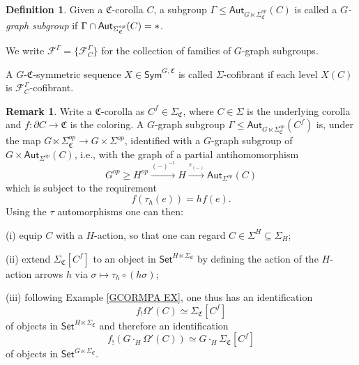 \documentclass[a4paper,10pt
,draft
]{article}%
\numberwithin{equation}{section}
\numberwithin{figure}{section}
\theoremstyle{definition} %
\newtheorem{definition}[equation]{Definition}%
\newtheorem{remark}[equation]{Remark}%
\newcommand{\1}{\ensuremath{\mathbbm 1}}%
\begin{document}
\begin{definition}
	Given a $\mathfrak{C}$-corolla $C$, 
	a subgroup 
	$\Gamma \leq \mathsf{Aut}_{G \ltimes \Sigma_{\mathfrak{C}}^{op}}(C)$
	is called a \textit{$G$-graph subgroup} if
	$\Gamma \cap \mathsf{Aut}_{\Sigma_{\mathfrak{C}}^{op}}(C) = \**$.
	
	We write $\mathcal{F}^{\Gamma} = \{\mathcal{F}^{\Gamma}_C\}$
	for the collection of families of $G$-graph subgroups.
	
	A $G$-$\mathfrak{C}$-symmetric sequence
	$X \in \mathsf{Sym}^{G,\mathfrak{C}}$
	is called $\Sigma$-cofibrant if each level
	$X(C)$ is $\mathcal{F}^{\Gamma}_C$-cofibrant.
\end{definition}


\begin{remark}
	Write a $\mathfrak{C}$-corolla as $C^f \in \Sigma_{\mathfrak{C}}$,
	where $C \in \Sigma$ is the underlying corolla and
	$f\colon \partial C \to \mathfrak{C}$
	is the coloring.
	A $G$-graph subgroup 
	$\Gamma \leq \mathsf{Aut}_{G \ltimes \Sigma_{\mathfrak{C}}^{op}}(C^f)$ is, under the map 
	$G \ltimes \Sigma_{\mathfrak{C}}^{op} \to
	G \times \Sigma^{op}$,
	identified with a 
	$G$-graph subgroup of 
	$G \times \mathsf{Aut}_{\Sigma^{op}}(C)$,
	i.e., with the graph of a partial antihomomorphism
	\[
	G^{op} \geq H^{op} \xrightarrow{(-)^{-1}} H 
	\xrightarrow{\tau_{(-)}} \mathsf{Aut}_{\Sigma^{op}}(C)
	\]
	which is subject to the requirement
	\[
	f(\tau_h(e)) = h f(e).
	\]
	Using the $\tau$ automorphisms one can then:
	\begin{enumerate*}[mode=unboxed]
		\item[(i)] equip $C$ with a $H$-action,
		so that one can regard $C \in \Sigma^H \subseteq \Sigma_H$;
		\item[(ii)] extend $\Sigma_{\mathfrak{C}}[C^f]$ to 
		an object in $\mathsf{Set}^{H \ltimes \Sigma_{\mathfrak{C}}}$
		by defining the action of the $H$-action arrows $h$ via 
		$\sigma \mapsto \tau_{h} \circ (h \sigma)$;
		\item[(iii)]
		following Example \ref{GCORMPA EX}, one thus has an identification
		\[
		f_{!} \Omega'(C) \simeq \Sigma_{\mathfrak{C}}[C^f]
		\]
		of objects in $\mathsf{Set}^{H \ltimes \Sigma_{\mathfrak{C}}}$ and therefore an identification 
		\[
		f_{!} \left( G \cdot_H \Omega'(C) \right) \simeq 
		G\cdot_H \Sigma_{\mathfrak{C}}[C^f]
		\]
		of objects in $\mathsf{Set}^{G \ltimes \Sigma_{\mathfrak{C}}}$.
	\end{enumerate*}
\end{remark}
\end{document}
